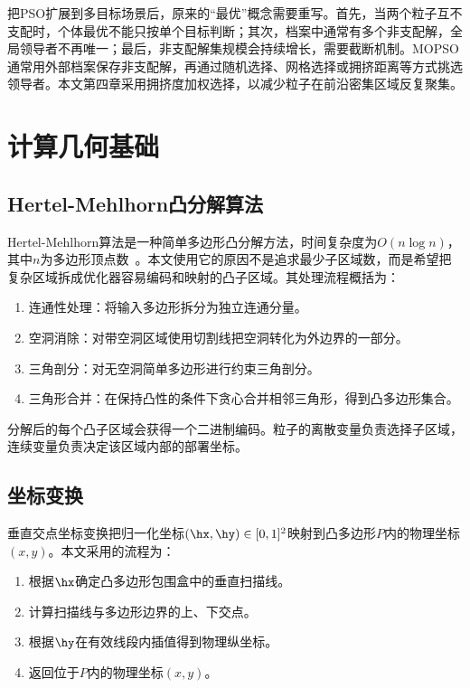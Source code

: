 把PSO扩展到多目标场景后，原来的“最优”概念需要重写。首先，当两个粒子互不支配时，个体最优不能只按单个目标判断；其次，档案中通常有多个非支配解，全局领导者不再唯一；最后，非支配解集规模会持续增长，需要截断机制。MOPSO通常用外部档案保存非支配解，再通过随机选择、网格选择或拥挤距离等方式挑选领导者。本文第四章采用拥挤度加权选择，以减少粒子在前沿密集区域反复聚集。

\section{计算几何基础}

\subsection{Hertel-Mehlhorn凸分解算法}

Hertel-\allowbreak Mehlhorn算法是一种简单多边形凸分解方法，时间复杂度为$O(n\log n)$，其中$n$为多边形顶点数~\cite{Hertel1983}。本文使用它的原因不是追求最少子区域数，而是希望把复杂区域拆成优化器容易编码和映射的凸子区域。其处理流程概括为：

\begin{enumerate}
    \item 连通性处理：将输入多边形拆分为独立连通分量。
    \item 空洞消除：对带空洞区域使用切割线把空洞转化为外边界的一部分。
    \item 三角剖分：对无空洞简单多边形进行约束三角剖分。
    \item 三角形合并：在保持凸性的条件下贪心合并相邻三角形，得到凸多边形集合。
\end{enumerate}

分解后的每个凸子区域会获得一个二进制编码。粒子的离散变量负责选择子区域，连续变量负责决定该区域内部的部署坐标。

\subsection{坐标变换}

垂直交点坐标变换把归一化坐标$(\hx, \hy)\in[0,1]^2$映射到凸多边形$P$内的物理坐标$(x,y)$。本文采用的流程为：

\begin{enumerate}
    \item 根据$\hx$确定凸多边形包围盒中的垂直扫描线。
    \item 计算扫描线与多边形边界的上、下交点。
    \item 根据$\hy$在有效线段内插值得到物理纵坐标。
    \item 返回位于$P$内的物理坐标$(x,y)$。
\end{enumerate}

